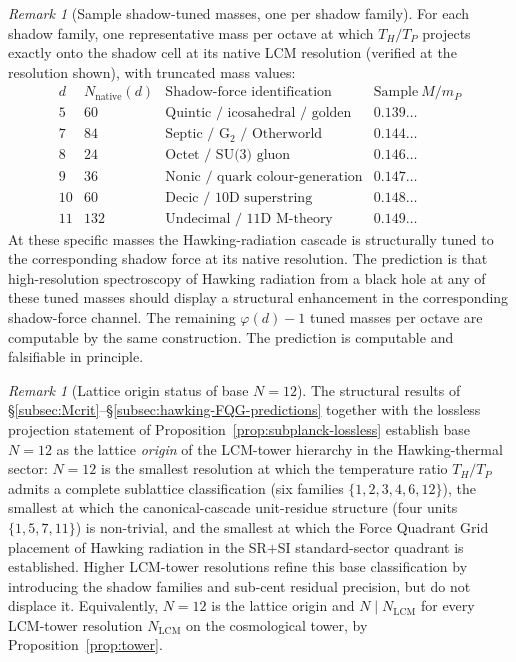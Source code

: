 \documentclass[11pt,a4paper]{article}
\theoremstyle{definition}
\theoremstyle{remark}
\newtheorem{remark}[theorem]{Remark}
\begin{document}
\begin{remark}[Sample shadow-tuned masses, one per shadow family]\label{rem:shadow-tuning-sample}
For each shadow family, one representative mass per octave at which $T_{H}/T_{P}$ projects exactly onto the shadow cell at its native LCM resolution (verified at the resolution shown), with truncated mass values:
\[
\begin{array}{c|c|l|l}
d & N_{\text{native}}(d) & \text{Shadow-force identification} & \text{Sample}~M/m_{P} \\ \hline
5  & 60  & \text{Quintic / icosahedral / golden} & 0.139\ldots \\
7  & 84  & \text{Septic / G$_{2}$ / Otherworld} & 0.144\ldots \\
8  & 24  & \text{Octet / SU(3) gluon} & 0.146\ldots \\
9  & 36  & \text{Nonic / quark colour-generation} & 0.147\ldots \\
10 & 60  & \text{Decic / 10D superstring} & 0.148\ldots \\
11 & 132 & \text{Undecimal / 11D M-theory} & 0.149\ldots
\end{array}
\]
At these specific masses the Hawking-radiation cascade is structurally tuned to the corresponding shadow force at its native resolution. The prediction is that high-resolution spectroscopy of Hawking radiation from a black hole at any of these tuned masses should display a structural enhancement in the corresponding shadow-force channel. The remaining $\varphi(d)-1$ tuned masses per octave are computable by the same construction. The prediction is computable and falsifiable in principle.
\end{remark}

\begin{remark}[Lattice origin status of base $N=12$]\label{rem:N12-origin}
The structural results of \S\ref{subsec:Mcrit}--\S\ref{subsec:hawking-FQG-predictions} together with the lossless projection statement of Proposition~\ref{prop:subplanck-lossless} establish base $N=12$ as the lattice \emph{origin} of the LCM-tower hierarchy in the Hawking-thermal sector: $N=12$ is the smallest resolution at which the temperature ratio $T_{H}/T_{P}$ admits a complete sublattice classification (six families $\{1,2,3,4,6,12\}$), the smallest at which the canonical-cascade unit-residue structure (four units $\{1,5,7,11\}$) is non-trivial, and the smallest at which the Force Quadrant Grid placement of Hawking radiation in the SR$+$SI standard-sector quadrant is established. Higher LCM-tower resolutions refine this base classification by introducing the shadow families and sub-cent residual precision, but do not displace it. Equivalently, $N=12$ is the lattice origin and $N \mid N_{\text{LCM}}$ for every LCM-tower resolution $N_{\text{LCM}}$ on the cosmological tower, by Proposition~\ref{prop:tower}.
\end{remark}
\end{document}
